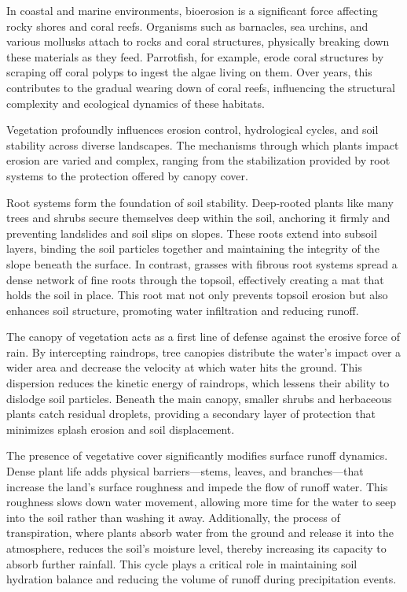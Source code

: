 In coastal and marine environments, bioerosion is a significant force affecting rocky shores and coral reefs. Organisms such as barnacles, sea urchins, and various mollusks attach to rocks and coral structures, physically breaking down these materials as they feed. Parrotfish, for example, erode coral structures by scraping off coral polyps to ingest the algae living on them. Over years, this contributes to the gradual wearing down of coral reefs, influencing the structural complexity and ecological dynamics of these habitats.

Vegetation profoundly influences erosion control, hydrological cycles, and soil stability across diverse landscapes. The mechanisms through which plants impact erosion are varied and complex, ranging from the stabilization provided by root systems to the protection offered by canopy cover.

Root systems form the foundation of soil stability. Deep-rooted plants like many trees and shrubs secure themselves deep within the soil, anchoring it firmly and preventing landslides and soil slips on slopes. These roots extend into subsoil layers, binding the soil particles together and maintaining the integrity of the slope beneath the surface. In contrast, grasses with fibrous root systems spread a dense network of fine roots through the topsoil, effectively creating a mat that holds the soil in place. This root mat not only prevents topsoil erosion but also enhances soil structure, promoting water infiltration and reducing runoff.

The canopy of vegetation acts as a first line of defense against the erosive force of rain. By intercepting raindrops, tree canopies distribute the water's impact over a wider area and decrease the velocity at which water hits the ground. This dispersion reduces the kinetic energy of raindrops, which lessens their ability to dislodge soil particles. Beneath the main canopy, smaller shrubs and herbaceous plants catch residual droplets, providing a secondary layer of protection that minimizes splash erosion and soil displacement.

The presence of vegetative cover significantly modifies surface runoff dynamics. Dense plant life adds physical barriers—stems, leaves, and branches—that increase the land's surface roughness and impede the flow of runoff water. This roughness slows down water movement, allowing more time for the water to seep into the soil rather than washing it away. Additionally, the process of transpiration, where plants absorb water from the ground and release it into the atmosphere, reduces the soil's moisture level, thereby increasing its capacity to absorb further rainfall. This cycle plays a critical role in maintaining soil hydration balance and reducing the volume of runoff during precipitation events.

